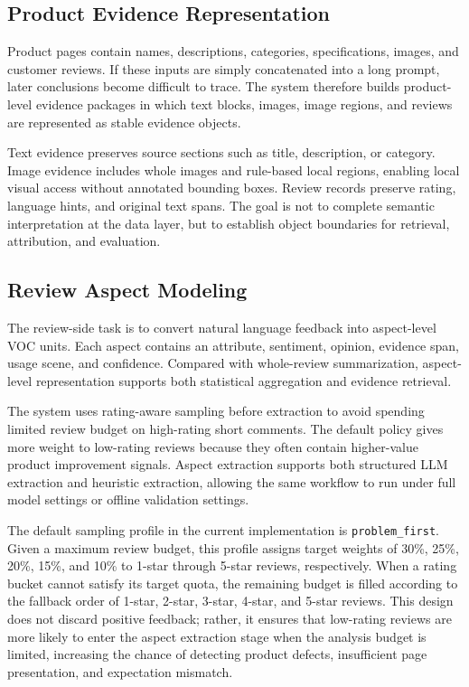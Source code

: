 \documentclass[11pt]{article}
\begin{document}
\subsection{Product Evidence Representation}

Product pages contain names, descriptions, categories, specifications, images, and customer reviews. If these inputs are simply concatenated into a long prompt, later conclusions become difficult to trace. The system therefore builds product-level evidence packages in which text blocks, images, image regions, and reviews are represented as stable evidence objects.

Text evidence preserves source sections such as title, description, or category. Image evidence includes whole images and rule-based local regions, enabling local visual access without annotated bounding boxes. Review records preserve rating, language hints, and original text spans. The goal is not to complete semantic interpretation at the data layer, but to establish object boundaries for retrieval, attribution, and evaluation.

\subsection{Review Aspect Modeling}

The review-side task is to convert natural language feedback into aspect-level VOC units. Each aspect contains an attribute, sentiment, opinion, evidence span, usage scene, and confidence. Compared with whole-review summarization, aspect-level representation supports both statistical aggregation and evidence retrieval.

The system uses rating-aware sampling before extraction to avoid spending limited review budget on high-rating short comments. The default policy gives more weight to low-rating reviews because they often contain higher-value product improvement signals. Aspect extraction supports both structured LLM extraction and heuristic extraction, allowing the same workflow to run under full model settings or offline validation settings.

The default sampling profile in the current implementation is \texttt{problem\_first}. Given a maximum review budget, this profile assigns target weights of 30\%, 25\%, 20\%, 15\%, and 10\% to 1-star through 5-star reviews, respectively. When a rating bucket cannot satisfy its target quota, the remaining budget is filled according to the fallback order of 1-star, 2-star, 3-star, 4-star, and 5-star reviews. This design does not discard positive feedback; rather, it ensures that low-rating reviews are more likely to enter the aspect extraction stage when the analysis budget is limited, increasing the chance of detecting product defects, insufficient page presentation, and expectation mismatch.
\end{document}
